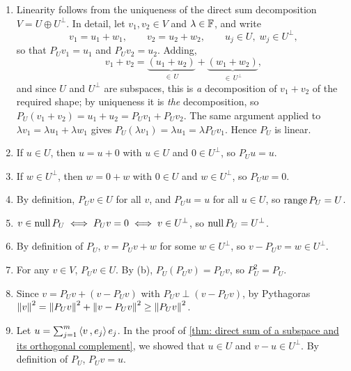 \begin{prf}
  \begin{enumerate}[label=\textbf{(\alph*)}]
    \item Linearity follows from the uniqueness of the direct sum decomposition $V = U \oplus U^\bot$. In detail, let $v_1, v_2 \in V$ and $\lambda \in \mathbb{F}$, and write
    \begin{equation}
      v_1 = u_1 + w_1, \qquad v_2 = u_2 + w_2, \qquad u_j \in U, \; w_j \in U^\bot,
    \end{equation}
    so that $P_U v_1 = u_1$ and $P_U v_2 = u_2$. Adding,
    \begin{equation}
      v_1 + v_2 = \underbrace{(u_1 + u_2)}_{\in \, U} + \underbrace{(w_1 + w_2)}_{\in \, U^\bot},
    \end{equation}
    and since $U$ and $U^\bot$ are subspaces, this is \emph{a} decomposition of $v_1+v_2$ of the required shape; by uniqueness it is \emph{the} decomposition, so $P_U(v_1+v_2) = u_1 + u_2 = P_U v_1 + P_U v_2$. The same argument applied to $\lambda v_1 = \lambda u_1 + \lambda w_1$ gives $P_U(\lambda v_1) = \lambda u_1 = \lambda P_U v_1$. Hence $P_U$ is linear.
    \item If $u \in U$, then $u = u + 0$ with $u \in U$ and $0 \in U^\bot$, so $P_U u = u$.
    \item If $w \in U^\bot$, then $w = 0 + w$ with $0 \in U$ and $w \in U^\bot$, so $P_U w = 0$.
    \item By definition, $P_U v \in U$ for all $v$, and $P_U u = u$ for all $u \in U$, so $\operatorname{range} P_U = U$.
    \item $v \in \operatorname{null} P_U \iff P_U v = 0 \iff v \in U^\bot$, so $\operatorname{null} P_U = U^\bot$.
    \item By definition of $P_U$, $v = P_U v + w$ for some $w \in U^\bot$, so $v - P_U v = w \in U^\bot$.
    \item For any $v \in V$, $P_U v \in U$. By (b), $P_U(P_U v) = P_U v$, so $P_U^2 = P_U$.
    \item Since $v = P_U v + (v - P_U v)$ with $P_U v \perp (v - P_U v)$, by Pythagoras $\left \lVert v \right \rVert^2 = \left \lVert P_U v \right \rVert^2 + \left \lVert v - P_U v \right \rVert^2 \geq \left \lVert P_U v \right \rVert^2$.
    \item Let $u = \sum_{j=1}^m \ip{v}{e_j} e_j$. In the proof of \ref{thm: direct sum of a subspace and its orthogonal complement}, we showed that $u \in U$ and $v - u \in U^\bot$. By definition of $P_U$, $P_U v = u$.
  \end{enumerate}
  \vspace{-\baselineskip}
\end{prf}

